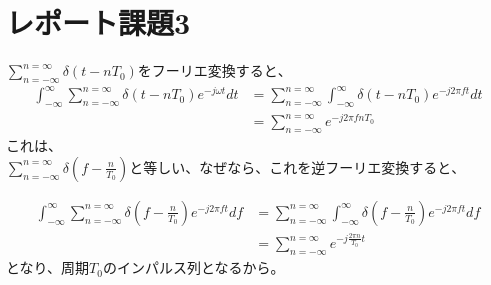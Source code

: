 \documentclass[dvipdfmx]{jsarticle}
\begin{document}
\section*{レポート課題3}
$\displaystyle \sum _{n = -\infty} ^{n=\infty} \delta(t-nT_{0})をフーリエ変換すると、$
\begin{align*}
\int _{-\infty} ^{\infty} \sum _{n = -\infty} ^{n=\infty} \delta(t-nT_{0})e^{-j\omega t}dt &= \sum _{n = -\infty} ^{n=\infty} \int _{-\infty} ^{\infty} \delta(t-nT_{0})e^{-j2\pi f t}dt\\
&= \sum _{n = -\infty} ^{n=\infty} e^{-j2\pi f nT_{0}}
\end{align*}
これは、 $\displaystyle \sum _{n = -\infty} ^{n=\infty} \delta(f-\frac{n}{T_{0}})と等しい、なぜなら、これを逆フーリエ変換すると、$

\begin{align*}
\int _{-\infty} ^{\infty} \sum _{n = -\infty} ^{n=\infty} \delta(f-\frac{n}{T_{0}})e^{-j2\pi f t}df &= \sum _{n = -\infty} ^{n=\infty} \int _{-\infty} ^{\infty} \delta(f-\frac{n}{T_{0}})e^{-j2\pi f t}df\\
&= \sum _{n = -\infty} ^{n=\infty} e^{-j\frac{2\pi n}{T_{0}}t}
\end{align*}
となり、周期$T_{0}$のインパルス列となるから。
\end{document}
